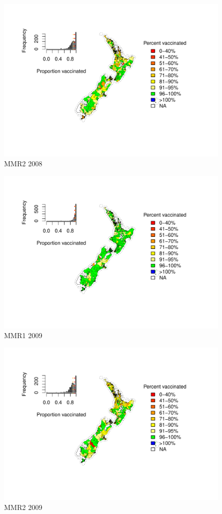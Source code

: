 \documentclass{article}
\begin{document}
\begin{figure}
    \centering
    \includegraphics[width=5.0in]{nir_census_MMR2_NIR_2008.pdf}
    \caption{MMR2 2008}
\end{figure}


\begin{figure}
    \centering
    \includegraphics[width=5.0in]{nir_census_MMR1_NIR_2009.pdf}
    \caption{MMR1 2009}
\end{figure}

\begin{figure}
    \centering
    \includegraphics[width=5.0in]{nir_census_MMR2_NIR_2009.pdf}
    \caption{MMR2 2009}
\end{figure}
\end{document}
